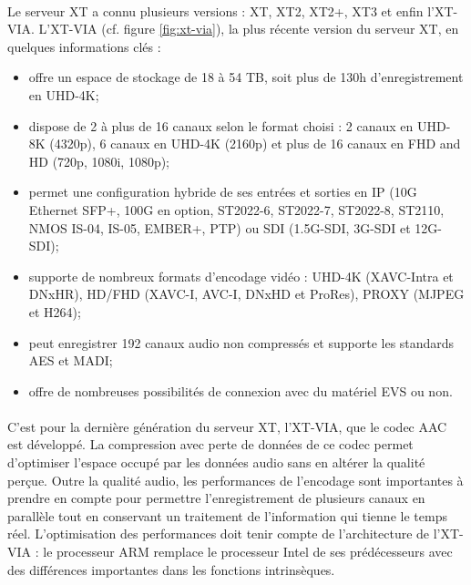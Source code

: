 \documentclass{article}
\begin{document}
    \paragraph{}
    Le serveur XT a connu plusieurs versions : XT, XT2, XT2+, XT3 et enfin l'XT-VIA. L'XT-VIA (cf. figure \ref{fig:xt-via}), la plus récente version du serveur XT, en quelques informations clés\cite{EVS:products} :
    \begin{itemize}
        \item offre un espace de stockage de 18 à 54 TB, soit plus de 130h d'enregistrement en UHD-4K;
        \item dispose de 2 à plus de 16 canaux selon le format choisi : 2 canaux en UHD-8K (4320p), 6 canaux en UHD-4K (2160p) et plus de 16 canaux en FHD and HD (720p, 1080i, 1080p);
        \item permet une configuration hybride de ses entrées et sorties en IP (10G Ethernet SFP+, 100G en option, ST2022-6, ST2022-7, ST2022-8, ST2110, NMOS IS-04, IS-05, EMBER+, PTP) ou SDI (1.5G-SDI, 3G-SDI et 12G-SDI);
        \item supporte de nombreux formats d'encodage vidéo : UHD-4K (XAVC-Intra et DNxHR), HD/FHD (XAVC-I, AVC-I, DNxHD et ProRes), PROXY (MJPEG et H264);
        \item peut enregistrer 192 canaux audio non compressés et supporte les standards AES et MADI;
        \item offre de nombreuses possibilités de connexion avec du matériel EVS ou non.
    \end{itemize}

    \paragraph{}
    C'est pour la dernière génération du serveur XT, l'XT-VIA, que le codec AAC est développé. La compression avec perte de données de ce codec permet d'optimiser l'espace occupé par les données audio sans en altérer la qualité perçue. Outre la qualité audio, les performances de l'encodage sont importantes à prendre en compte pour permettre l'enregistrement de plusieurs canaux en parallèle tout en conservant un traitement de l'information qui tienne le temps réel. L'optimisation des performances doit tenir compte de l'architecture de l'XT-VIA : le processeur ARM remplace le processeur Intel de ses prédécesseurs avec des différences importantes dans les fonctions intrinsèques.


\end{document}
